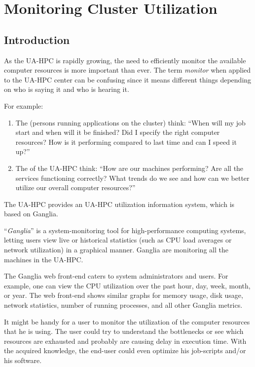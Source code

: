 \chapter{Monitoring Cluster Utilization}
\label{ch:monitoring-cluster-utilization}

\section{Introduction}

As the UA-HPC is rapidly growing, the need to efficiently monitor the available
computer resources is more important than ever. The term \emph{monitor} when
applied to the UA-HPC center can be confusing since it means different things
depending on who is saying it and who is hearing it.

For example:

\begin{enumerate}
\item  The  (persons running applications on the cluster) think: ``When will my job start and when will it be finished? Did I specify the right computer resources?  How is it performing compared to last time and can I speed it up?''
\item  The  of the UA-HPC think: ``How are our machines performing? Are all the services functioning correctly? What trends do we see and how can we better utilize our overall computer resources?''
\end{enumerate}

The UA-HPC provides an UA-HPC utilization information system, which is based on Ganglia.

``\emph{Ganglia}'' is a system-monitoring tool for high-performance computing
systems, letting users view live or historical statistics (such as CPU load
averages or network utilization) in a graphical manner. Ganglia are monitoring
all the machines in the UA-HPC.

The Ganglia web front-end caters to system administrators and users. For
example, one can view the CPU utilization over the past hour, day, week, month,
or year. The web front-end shows similar graphs for memory usage, disk usage,
network statistics, number of running processes, and all other Ganglia metrics.

It might be handy for a user to monitor the utilization of the computer
resources that he is using. The user could try to understand the bottlenecks or
see which resources are exhausted and probably are causing delay in execution
time. With the acquired knowledge, the end-user could even optimize his
job-scripts and/or his software.

